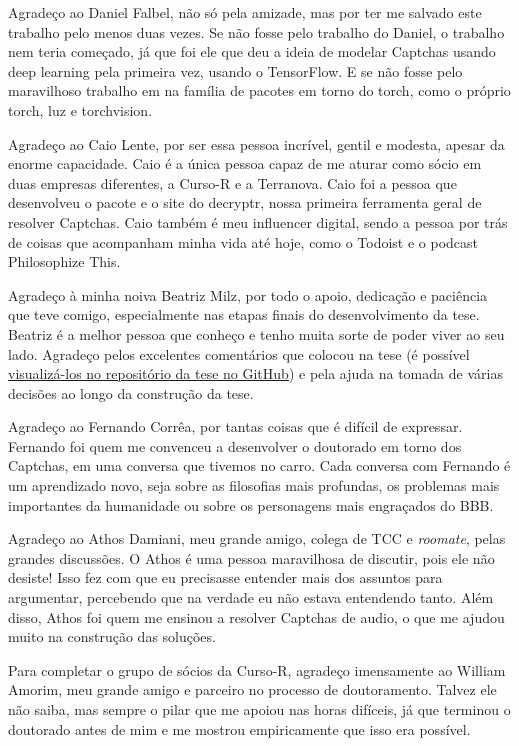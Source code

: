 \documentclass[12pt,twoside,brazilian]{book}
\begin{document}
Agradeço ao Daniel Falbel, não só pela amizade, mas por ter me salvado este trabalho pelo menos duas vezes. Se não fosse pelo trabalho do Daniel, o trabalho nem teria começado, já que foi ele que deu a ideia de modelar Captchas usando deep learning pela primeira vez, usando o TensorFlow. E se não fosse pelo maravilhoso trabalho em na família de pacotes em torno do torch, como o próprio torch, luz e torchvision.

Agradeço ao Caio Lente, por ser essa pessoa incrível, gentil e modesta, apesar da enorme capacidade. Caio é a única pessoa capaz de me aturar como sócio em duas empresas diferentes, a Curso-R e a Terranova. Caio foi a pessoa que desenvolveu o pacote e o site do decryptr, nossa primeira ferramenta geral de resolver Captchas. Caio também é meu influencer digital, sendo a pessoa por trás de coisas que acompanham minha vida até hoje, como o Todoist e o podcast Philosophize This.

Agradeço à minha noiva Beatriz Milz, por todo o apoio, dedicação e paciência que teve comigo, especialmente nas etapas finais do desenvolvimento da tese. Beatriz é a melhor pessoa que conheço e tenho muita sorte de poder viver ao seu lado. Agradeço pelos excelentes comentários que colocou na tese (é possível \href{https://github.com/jtrecenti/doutorado/pulls?q=is\%3Apr}{visualizá-los no repositório da tese no GitHub}) e pela ajuda na tomada de várias decisões ao longo da construção da tese.

Agradeço ao Fernando Corrêa, por tantas coisas que é difícil de expressar. Fernando foi quem me convenceu a desenvolver o doutorado em torno dos Captchas, em uma conversa que tivemos no carro. Cada conversa com Fernando é um aprendizado novo, seja sobre as filosofias mais profundas, os problemas mais importantes da humanidade ou sobre os personagens mais engraçados do BBB.

Agradeço ao Athos Damiani, meu grande amigo, colega de TCC e \textit{roomate}, pelas grandes discussões. O Athos é uma pessoa maravilhosa de discutir, pois ele não desiste! Isso fez com que eu precisasse entender mais dos assuntos para argumentar, percebendo que na verdade eu não estava entendendo tanto. Além disso, Athos foi quem me ensinou a resolver Captchas de audio, o que me ajudou muito na construção das soluções.

Para completar o grupo de sócios da Curso-R, agradeço imensamente ao William Amorim, meu grande amigo e parceiro no processo de doutoramento. Talvez ele não saiba, mas sempre o pilar que me apoiou nas horas difíceis, já que terminou o doutorado antes de mim e me mostrou empiricamente que isso era possível.
\end{document}
